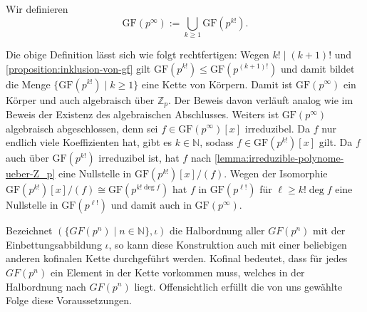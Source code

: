 \begin{definition}
    Wir definieren 
        $$ \mathrm{GF}\left(p^\infty\right) := \bigcup_{k \ge 1} \mathrm{GF}\left(p^{k!}\right). $$
\end{definition}
\begin{remark}
    Die obige Definition lässt sich wie folgt rechtfertigen: Wegen $k!\mid (k+1)!$ und \cref{proposition:inklusion-von-gf} gilt $\mathrm{GF}(p^{k!})\le \mathrm{GF}(p^{(k+1)!})$ und damit bildet die Menge $\{\mathrm{GF}(p^{k!})\mid k\geq 1\}$ eine Kette von Körpern. Damit ist $\mathrm{GF}(p^\infty)$ ein Körper und auch algebraisch über $\mathbb{Z}_p$. Der Beweis davon verläuft analog wie im Beweis der Existenz des algebraischen Abschlusses. Weiters ist $\mathrm{GF}(p^\infty)$ algebraisch abgeschlossen, denn sei $f \in \mathrm{GF}(p^\infty)[x]$ irreduzibel. Da $f$ nur endlich viele Koeffizienten hat, gibt es $k\in\mathbb{N}$, sodass $f \in \mathrm{GF}(p^{k!})[x]$ gilt. Da $f$ auch über $\mathrm{GF}(p^{k!})$ irreduzibel ist, hat $f$ nach \cref{lemma:irreduzible-polynome-ueber-Z_p} eine Nullstelle in $\mathrm{GF}(p^{k!})[x]/(f)$. Wegen der Isomorphie $\mathrm{GF}(p^{k!})[x]/(f)\cong \mathrm{GF}(p^{k!\deg f})$ hat $f$ in $\mathrm{GF}(p^{\ell !})$ für $\ell\geq k!\deg f$ eine Nullstelle in $\mathrm{GF}(p^{\ell !})$ und damit auch in $\mathrm{GF}(p^\infty)$.

    Bezeichnet $(\{GF(p^{n})\mid n\in\mathbb{N}\},\iota)$ die Halbordnung aller $GF(p^n)$ mit der Einbettungsabbildung $\iota$, so kann diese Konstruktion auch mit einer beliebigen anderen kofinalen Kette durchgeführt werden. Kofinal bedeutet, dass für jedes $GF(p^n)$ ein Element in der Kette vorkommen muss, welches in der Halbordnung nach $GF(p^n)$ liegt. Offensichtlich erfüllt die von uns gewählte Folge diese Voraussetzungen.
\end{remark}